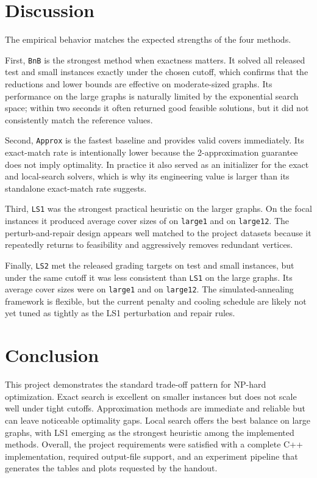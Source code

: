 \documentclass[sigconf,nonacm]{acmart}
\begin{document}
\section{Discussion}
The empirical behavior matches the expected strengths of the four methods.

First, \texttt{BnB} is the strongest method when exactness matters. It solved all released test and small instances exactly under the chosen cutoff, which confirms that the reductions and lower bounds are effective on moderate-sized graphs. Its performance on the large graphs is naturally limited by the exponential search space; within two seconds it often returned good feasible solutions, but it did not consistently match the reference values.

Second, \texttt{Approx} is the fastest baseline and provides valid covers immediately. Its exact-match rate is intentionally lower because the 2-approximation guarantee does not imply optimality. In practice it also served as an initializer for the exact and local-search solvers, which is why its engineering value is larger than its standalone exact-match rate suggests.

Third, \texttt{LS1} was the strongest practical heuristic on the larger graphs. On the focal instances it produced average cover sizes of \LargeOneLSOneAvg on \texttt{large1} and \LargeTwelveLSOneAvg on \texttt{large12}. The perturb-and-repair design appears well matched to the project datasets because it repeatedly returns to feasibility and aggressively removes redundant vertices.

Finally, \texttt{LS2} met the released grading targets on test and small instances, but under the same cutoff it was less consistent than \texttt{LS1} on the large graphs. Its average cover sizes were \LargeOneLSTwoAvg on \texttt{large1} and \LargeTwelveLSTwoAvg on \texttt{large12}. The simulated-annealing framework is flexible, but the current penalty and cooling schedule are likely not yet tuned as tightly as the LS1 perturbation and repair rules.

\section{Conclusion}
This project demonstrates the standard trade-off pattern for NP-hard optimization. Exact search is excellent on smaller instances but does not scale well under tight cutoffs. Approximation methods are immediate and reliable but can leave noticeable optimality gaps. Local search offers the best balance on large graphs, with LS1 emerging as the strongest heuristic among the implemented methods. Overall, the project requirements were satisfied with a complete C++ implementation, required output-file support, and an experiment pipeline that generates the tables and plots requested by the handout.
\end{document}
